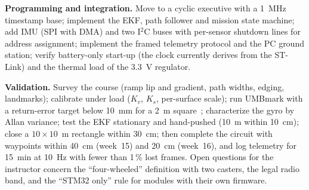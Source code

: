 \documentclass[conference]{IEEEtran}\newcommand{\haveieee}{}%
\begin{document}
\textbf{Programming and integration.} Move to a cyclic executive with a 1~MHz timestamp base; implement the EKF, path follower and mission state machine; add IMU (SPI with DMA) and two I$^2$C buses with per-sensor shutdown lines for address assignment; implement the framed telemetry protocol and the PC ground station; verify battery-only start-up (the clock currently derives from the ST-Link) and the thermal load of the 3.3~V regulator.

\textbf{Validation.} Survey the course (ramp lip and gradient, path widths, edging, landmarks); calibrate under load ($K_v$, $K_s$, per-surface scale); run UMBmark with a return-error target below 10~mm for a 2~m square~\cite{borenstein1996}; characterize the gyro by Allan variance; test the EKF stationary and hand-pushed (10~m within 10~cm); close a $10\times10$~m rectangle within 30~cm; then complete the circuit with waypoints within 40~cm (week~15) and 20~cm (week~16), and log telemetry for 15~min at 10~Hz with fewer than 1\,\% lost frames. Open questions for the instructor concern the ``four-wheeled'' definition with two casters, the legal radio band, and the ``STM32 only'' rule for modules with their own firmware.
\end{document}

